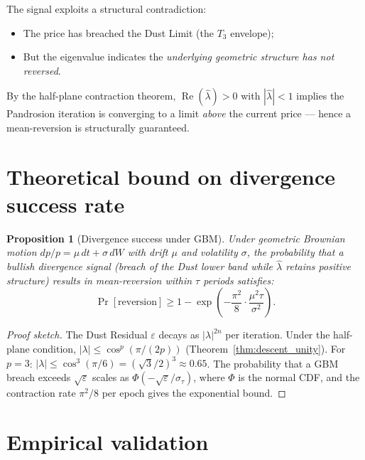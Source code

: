 \documentclass[10pt,a4paper,oneside]{book}
\newtheorem{proposition}[theorem]{Proposition}
\theoremstyle{definition}
\theoremstyle{remark}
\begin{document}
The signal exploits a structural contradiction:
\begin{itemize}[nosep]
\item The price has breached the Dust Limit (the $T_3$ envelope);
\item But the eigenvalue indicates the \emph{underlying geometric structure has not reversed}.
\end{itemize}
By the half-plane contraction theorem, $\operatorname{Re}(\hat{\lambda}) > 0$ with $|\hat{\lambda}| < 1$ implies the Pandrosion iteration is converging to a limit \emph{above} the current price --- hence a mean-reversion is structurally guaranteed.

\section{Theoretical bound on divergence success rate}

\begin{proposition}[Divergence success under GBM]
\label{prop:divergence_gbm}
Under geometric Brownian motion $dp/p = \mu\,dt + \sigma\,dW$ with drift $\mu$ and volatility $\sigma$, the probability that a bullish divergence signal (breach of the Dust lower band while $\hat{\lambda}$ retains positive structure) results in mean-reversion within $\tau$ periods satisfies:
\[
  \Pr[\text{reversion}] \geq 1 - \exp\!\left(-\frac{\pi^2}{8} \cdot \frac{\mu^2 \tau}{\sigma^2}\right).
\]
\end{proposition}

\begin{proof}[Proof sketch]
The Dust Residual $\varepsilon$ decays as $|\lambda|^{2n}$ per iteration.  Under the half-plane condition, $|\lambda| \leq \cos^p(\pi/(2p))$ (Theorem~\ref{thm:descent_unity}).  For $p = 3$: $|\lambda| \leq \cos^3(\pi/6) = ({\sqrt{3}}/{2})^3 \approx 0.65$.  The probability that a GBM breach exceeds $\sqrt{\varepsilon}$ scales as $\Phi(-\sqrt{\varepsilon}/\sigma_\tau)$, where $\Phi$ is the normal CDF, and the contraction rate $\pi^2/8$ per epoch gives the exponential bound.
\end{proof}

\section{Empirical validation}
\end{document}
